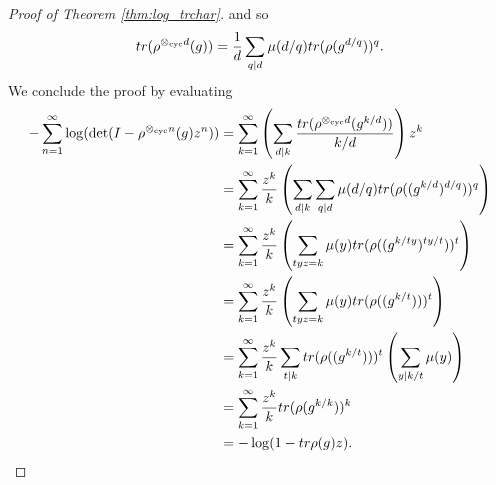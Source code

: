 \documentclass[10pt,a4paper]{amsart}
\begin{document}
\begin{proof}[Proof of Theorem \ref{thm:log_trchar}]
and so
\[
{\rm tr}(\rho^{\otimes_{\text{cyc}} d}(g)) = \frac{1}{d}\sum_{q\mid d}\mu(d/q){\rm tr}(\rho(g^{d/q}))^q.
\]
We conclude the proof by evaluating
\begin{align*}
-\sum_{n=1}^{\infty}\log(\det(I-\rho^{\otimes_{\text{cyc}} n}(g)z^n)) &=\sum_{k=1}^{\infty}\left(\sum_{d\mid k} \frac{{\rm tr}(\rho^{\otimes_{\text{cyc}} d}(g^{k/d}))}{k/d}\right)z^k\\
&=\sum_{k=1}^{\infty}\frac{z^k}{k}\left(\sum_{d\mid k} \sum_{q\mid d}\mu(d/q) {\rm tr}(\rho((g^{k/d})^{d/q}))^q\right)\\
&=\sum_{k=1}^{\infty}\frac{z^k}{k}\left(\sum_{tyz = k}\mu(y) {\rm tr}(\rho((g^{k/ty})^{ty/t}))^t\right)\\
&=\sum_{k=1}^{\infty}\frac{z^k}{k}\left(\sum_{tyz = k}\mu(y) {\rm tr}(\rho((g^{k/t})))^t\right)\\
&=\sum_{k=1}^{\infty}\frac{z^k}{k} \sum_{t\mid k}{\rm tr}(\rho((g^{k/t})))^t\left(\sum_{y\mid k/t} \mu(y)\right)\\
&=\sum_{k=1}^{\infty}\frac{z^k}{k} {\rm tr}(\rho(g^{k/k}))^k\\
&= -\log(1 - {\rm tr}\rho(g)z).
\end{align*}
\end{proof}
\end{document}
